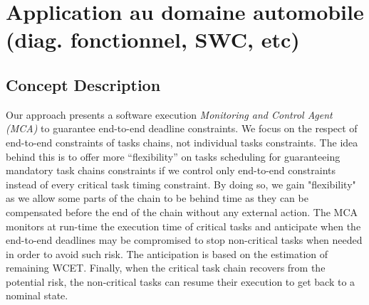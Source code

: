 \documentclass[french, a4paper, 11pt, twoside, pdftex]{StyleThese}
\begin{document}
            
\section{Application au domaine  automobile (diag. fonctionnel, SWC, etc)}
    \subsection{Concept Description}
        Our approach presents a software execution \emph{Monitoring and Control Agent (MCA)} to guarantee end-to-end deadline constraints.
        We focus on the respect of end-to-end constraints of tasks chains, not individual tasks constraints. The idea behind this is to offer more ``flexibility'' on tasks scheduling for guaranteeing mandatory task chains constraints if we control only end-to-end constraints instead of every critical task timing constraint. By doing so, we gain "flexibility" as we allow some parts of the chain to be behind time as they can be compensated before the end of the chain without any external action. The MCA monitors at run-time the execution time of critical tasks and anticipate when the end-to-end deadlines may be compromised to stop non-critical tasks when needed in order to avoid such risk. The anticipation is based on the estimation of remaining WCET. Finally, when the critical task chain recovers from the potential risk, the non-critical tasks can resume their execution to get back to a nominal state.
        
\end{document}
